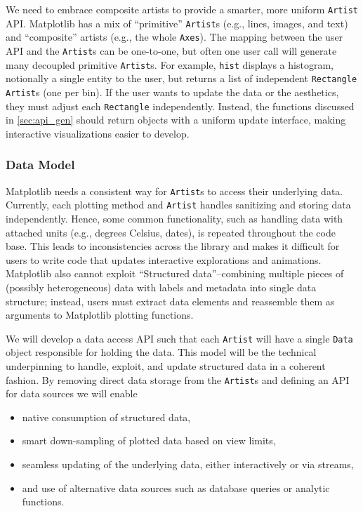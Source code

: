 \documentclass[12pt,letterpaper]{article}  %
\begin{document}
We need to embrace composite artists to provide a smarter, more uniform \texttt{Artist} API.
Matplotlib has a mix of ``primitive'' \texttt{Artist}s (e.g., lines, images, and text) and ``composite'' artists (e.g., the whole \texttt{Axes}). The mapping between the user API and the \texttt{Artist}s can be
one-to-one, but often one user call will generate many decoupled primitive \texttt{Artist}s.
For example, \texttt{hist} displays a histogram, notionally a single entity to the user,
but returns a list of independent \texttt{Rectangle} \texttt{Artist}s (one per bin).
If the user wants to update the data or the aesthetics, they must adjust each \texttt{Rectangle} independently.
Instead, the functions discussed in \ref{sec:api_gen} should return objects with
a uniform update interface, making interactive visualizations easier to develop.


\subsubsection{Data Model}
\label{sec:dm}
Matplotlib needs a consistent way for \texttt{Artist}s to access their
underlying data. Currently, each plotting method and \texttt{Artist}
handles sanitizing and storing data independently. Hence, some common
functionality, such as handling data with attached units (e.g.,
degrees Celsius, dates), is repeated throughout the code base. This
leads to inconsistencies across the library and makes it difficult for
users to write code that updates interactive explorations and
animations. Matplotlib also cannot exploit ``Structured
data''--combining multiple pieces of (possibly heterogeneous) data
with labels and metadata into single data structure; instead, users
must extract data elements and reassemble them as arguments to
Matplotlib plotting functions.

We will develop a data access API such that each \texttt{Artist} will have a single \texttt{Data} object responsible for holding the data. This model will be the technical underpinning to handle, exploit, and
update structured data in a coherent fashion. By removing direct data storage from the \texttt{Artist}s and defining an API for data sources we will enable

\begin{itemize}[noitemsep]
  \item native consumption of structured data,
  \item smart down-sampling of plotted data based on view limits,
  \item seamless updating of the underlying data, either interactively or via streams,
  \item and use of alternative data sources such as database queries or analytic functions.
\end{itemize}
\end{document}
